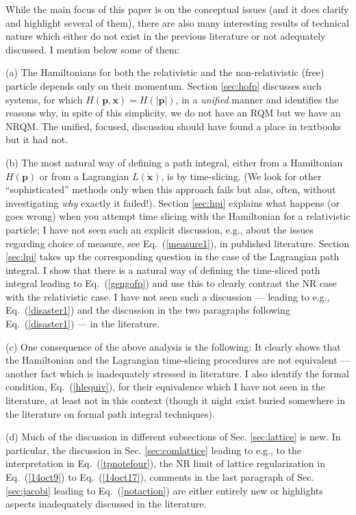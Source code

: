 \documentclass[12pt]{article}
\def\eq#1{{Eq.~(\ref{#1})}}
\begin{document}
While the main focus of this paper is on the conceptual issues (and it does clarify and highlight several of them), there are also many interesting results of technical nature which either do not exist in the previous literature or not adequately discussed. I mention below some of them:

(a) The Hamiltonians for both the relativistic and the non-relativistic (free) particle depends only on their momentum.  Section \ref{sec:hofp} discusses such systems, for which $H(\bm{p},\bm{x})=H(|\bm{p}|)$, in a \textit{unified} manner and identifies the reasons why, in spite of this simplicity, we do not have an RQM but we have an NRQM. The unified, focused, discussion should have found a place in textbooks but it had not.

(b) The most natural way of defining a path integral, either from a Hamiltonian $H(\bm p)$ or from a Lagrangian $L(\dot{\bm x})$, is by time-slicing. (We look for other ``sophisticated''  methods only when this approach fails but alas, often, without investigating \textit{why} exactly it failed!). Section \ref{sec:hpi} explains what happens (or goes wrong) when you attempt time slicing with the Hamiltonian for a relativistic particle; I have not seen such an explicit discussion, e.g., about the issues regarding choice of measure, see \eq{measure1}, in published literature. Section \ref{sec:lpi} takes up the corresponding question in the case of the Lagrangian path integral. I show that there is a natural way of defining the time-sliced path integral leading to \eq{gengofp} and use this to clearly contrast the NR case with the relativistic case. I have not seen such a discussion --- leading to e.g., \eq{disaster1} and the discussion in the  two paragraphs following \eq{disaster1} --- in the literature.

(c) One consequence of the above analysis is the following: It clearly shows that the Hamiltonian and the Lagrangian time-slicing procedures are not equivalent --- another fact which is inadequately stressed in literature. I also identify the formal condition, \eq{hlequiv}, for their equivalence which I have not seen in the literature, at least not in this context (though it night exist buried somewhere in the literature on formal path integral techniques).

(d) Much of the discussion in different subsections of Sec. \ref{sec:lattice} is new. In particular, the discussion in Sec. \ref{sec:comlattice} leading to e.g.,  to the interpretation in \eq{tpnotefour}, the NR limit of lattice regularization in \eq{14oct9} to \eq{14oct17}, comments in the last paragraph of Sec. \ref{sec:jacobi} leading to \eq{notaction} are either entirely new or highlights aspects inadequately discussed in the literature.
\end{document}
